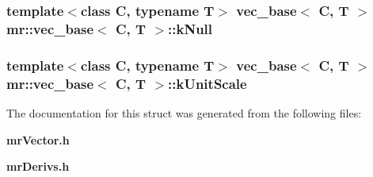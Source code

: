 \subsubsection{\setlength{\rightskip}{0pt plus 5cm}template$<$class C, typename T$>$ {\bf vec\_\-base}$<$ C, T $>$ {\bf mr::vec\_\-base}$<$ C, T $>$::{\bf k\-Null}\hspace{0.3cm}{\tt  [static]}}\label{structmr_1_1vec__base_s0}


\subsubsection{\setlength{\rightskip}{0pt plus 5cm}template$<$class C, typename T$>$ {\bf vec\_\-base}$<$ C, T $>$ {\bf mr::vec\_\-base}$<$ C, T $>$::{\bf k\-Unit\-Scale}\hspace{0.3cm}{\tt  [static]}}\label{structmr_1_1vec__base_s4}




The documentation for this struct was generated from the following files:\begin{CompactItemize}
\item 
{\bf mr\-Vector.h}\item 
{\bf mr\-Derivs.h}\end{CompactItemize}
